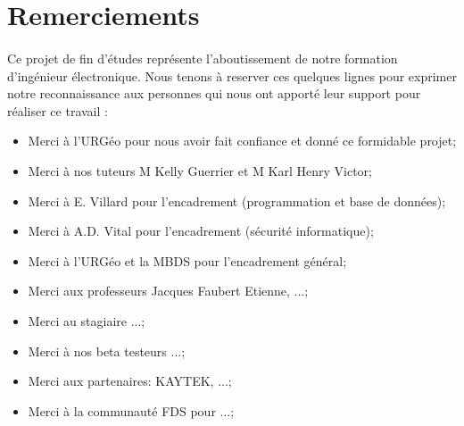 \section{Remerciements}
\paragraph{}
Ce projet de fin d’études représente l'aboutissement de notre formation d’ingénieur électronique. 
Nous tenons à reserver ces quelques lignes pour exprimer notre
reconnaissance aux personnes qui nous ont apporté leur support pour réaliser ce travail :

\begin{itemize}
    \item Merci à l'URGéo pour nous avoir fait confiance et donné ce formidable projet;\par
    \item Merci à nos tuteurs M Kelly Guerrier et M Karl Henry Victor;\par
    \item Merci à  E. Villard pour l'encadrement (programmation et base de données);\par
    \item Merci à A.D. Vital pour l'encadrement (sécurité informatique);\par
    \item Merci à l'URGéo et la MBDS pour l'encadrement général;\par
    \item Merci aux professeurs Jacques Faubert Etienne, ...;\par
    \item Merci au stagiaire ...;\par
    \item Merci à nos beta testeurs ...;\par
    \item Merci aux partenaires: KAYTEK, ...;\par
    \item Merci à la communauté FDS pour ...;\par
\end{itemize}
